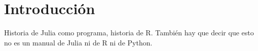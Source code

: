 \chapter{Introducción}
Historia de Julia como programa, historia de R. También hay que decir que esto no es un manual de Julia ni de R ni de Python. 